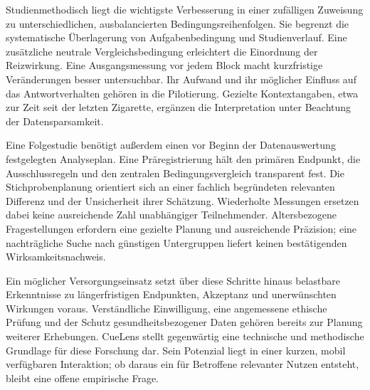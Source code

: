 Studienmethodisch liegt die wichtigste Verbesserung in einer zufälligen Zuweisung zu unterschiedlichen, ausbalancierten Bedingungsreihenfolgen. Sie begrenzt die systematische Überlagerung von Aufgabenbedingung und Studienverlauf. Eine zusätzliche neutrale Vergleichsbedingung erleichtert die Einordnung der Reizwirkung. Eine Ausgangsmessung vor jedem Block macht kurzfristige Veränderungen besser untersuchbar. Ihr Aufwand und ihr möglicher Einfluss auf das Antwortverhalten gehören in die Pilotierung. Gezielte Kontextangaben, etwa zur Zeit seit der letzten Zigarette, ergänzen die Interpretation unter Beachtung der Datensparsamkeit.

Eine Folgestudie benötigt außerdem einen vor Beginn der Datenauswertung festgelegten Analyseplan. Eine Präregistrierung hält den primären Endpunkt, die Ausschlussregeln und den zentralen Bedingungsvergleich transparent fest. Die Stichprobenplanung orientiert sich an einer fachlich begründeten relevanten Differenz und der Unsicherheit ihrer Schätzung. Wiederholte Messungen ersetzen dabei keine ausreichende Zahl unabhängiger Teilnehmender. Altersbezogene Fragestellungen erfordern eine gezielte Planung und ausreichende Präzision; eine nachträgliche Suche nach günstigen Untergruppen liefert keinen bestätigenden Wirksamkeitsnachweis.

Ein möglicher Versorgungseinsatz setzt über diese Schritte hinaus belastbare Erkenntnisse zu längerfristigen Endpunkten, Akzeptanz und unerwünschten Wirkungen voraus. Verständliche Einwilligung, eine angemessene ethische Prüfung und der Schutz gesundheitsbezogener Daten gehören bereits zur Planung weiterer Erhebungen. CueLens stellt gegenwärtig eine technische und methodische Grundlage für diese Forschung dar. Sein Potenzial liegt in einer kurzen, mobil verfügbaren Interaktion; ob daraus ein für Betroffene relevanter Nutzen entsteht, bleibt eine offene empirische Frage.

\par
\clearpage
\endgroup
